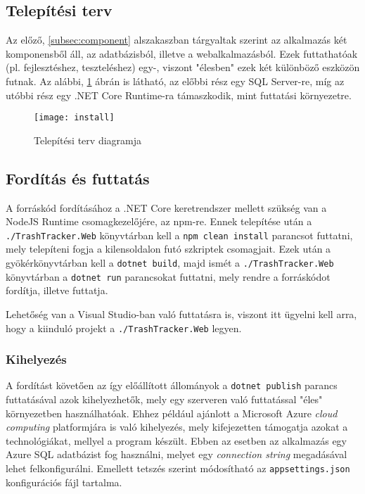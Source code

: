 \subsection{Telepítési terv}

Az előző, \ref{subsec:component} alszakaszban tárgyaltak szerint az alkalmazás két komponensből áll, az adatbázisból, illetve a webalkalmazásból. Ezek futtathatóak (pl. fejlesztéshez, teszteléshez) egy-, viszont "élesben" ezek két különböző eszközön futnak. Az alábbi, \ref{fig:install} ábrán  is látható, az előbbi rész egy SQL Server-re, míg az utóbbi rész egy .NET Core Runtime-ra támaszkodik, mint futtatási környezetre.

\begin{figure}[H]
	\centering
	\texttt{[image: install]}
	\caption{Telepítési terv diagramja}
	\label{fig:install}
\end{figure}

\subsection{Fordítás és futtatás}

A forráskód fordításához a .NET Core keretrendszer mellett szükség van a NodeJS Runtime csomagkezelőjére, az npm-re. Ennek telepítése után a \texttt{./TrashTracker.Web} könyvtárban kell a \texttt{npm clean install} parancsot futtatni, mely telepíteni fogja a kilensoldalon futó szkriptek csomagjait. Ezek után a gyökérkönyvtárban kell a \texttt{dotnet build}, majd ismét a \texttt{./TrashTracker.Web} könyvtárban a \texttt{dotnet run} parancsokat futtatni, mely rendre a forráskódot fordítja, illetve futtatja.
\begin{note}
	Lehetőség van a Visual Studio-ban való futtatásra is, viszont itt ügyelni kell arra, hogy a kiinduló projekt a \texttt{./TrashTracker.Web} legyen.
\end{note}

\subsubsection{Kihelyezés}

A fordítást követően az így előállított állományok a \texttt{dotnet publish} parancs futtatásával azok kihelyezhetők, mely egy szerveren való futtatással "éles" környezetben használhatóak. Ehhez például ajánlott a Microsoft Azure \textit{cloud computing} platformjára is való kihelyezés, mely kifejezetten támogatja azokat a technológiákat, mellyel a program készült. Ebben az esetben az alkalmazás egy Azure SQL adatbázist fog használni, melyet egy \textit{connection string} megadásával lehet felkonfigurálni. Emellett tetszés szerint módosítható az \texttt{appsettings.json} konfigurációs fájl tartalma. \cite{publish-aspnet-on-azure}

